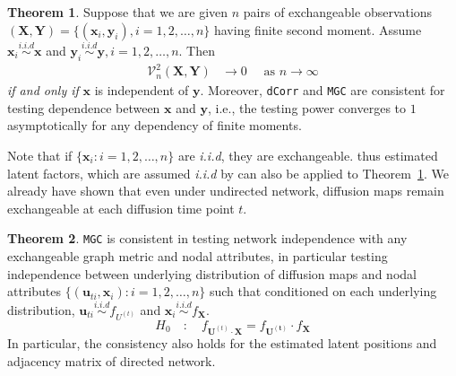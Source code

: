 \documentclass[12pt]{article}
\theoremstyle{definition}
\newtheorem{theorem}{Theorem}[section]
\begin{document}
\begin{theorem}
	Suppose that we are given $n$ pairs of exchangeable observations $(\mathbf{X}, \mathbf{Y}) = \{  (\mathbf{x}_{i}, \mathbf{y}_{i} ), i = 1,2, \ldots, n \}$ having finite second moment. Assume $\mathbf{x}_{i} \overset{i.i.d}{\sim} \mathbf{x}$ and $\mathbf{y}_{i} \overset{i.i.d}{\sim} \mathbf{y}, i = 1,2, \ldots, n$. Then
	\begin{eqnarray}
		\mathcal{V}_{n}^{2}(\mathbf{X},\mathbf{Y}) &\longrightarrow 0 \quad \mbox{ as } n \rightarrow \infty
	\end{eqnarray}	
	\textit{if and only if} $\mathbf{x}$ is independent of $\mathbf{y}$. Moreover, \texttt{dCorr} and \texttt{MGC} are consistent for testing dependence between $\mathbf{x}$ and $\mathbf{y}$, i.e., the testing power converges to $1$ asymptotically for any dependency of finite moments.
	\label{theoremMain}
\end{theorem}

Note that if $\{ \mathbf{x}_{i} : i = 1,2,\ldots, n \}$ are \textit{i.i.d}, they are exchangeable. thus estimated latent factors, which are assumed \textit{i.i.d} by \cite{fosdick2015testing} can also be applied to Theorem~\ref{theoremMain}. We already have shown that even under undirected network, diffusion maps remain exchangeable at each diffusion time point $t$. 

\begin{theorem}
	\label{theorem2}
	\texttt{MGC} is consistent in testing network independence with any exchangeable graph metric and nodal attributes, in particular testing independence between underlying distribution of diffusion maps and nodal attributes $\{ ( \mathbf{u}_{ti},  \mathbf{x}_{i}  ) : i =1,2, \ldots , n \}$ such that conditioned on each underlying distribution, $\mathbf{u}_{ti} \overset{i.i.d}{\sim} f_{U^(t)}$ and $\mathbf{x}_{i} \overset{i.i.d}{\sim} f_{\mathbf{X}}$.
	\begin{equation}
	H_{0}  \quad : \quad f_{\mathbf{U}^{(t)} \cdot \mathbf{X}  }  = f_{\mathbf{U^{(t)}}} \cdot f_{\mathbf{X}}
	\label{eq:hypothesis}
	\end{equation}
	 In particular, the consistency also holds for the estimated latent positions and adjacency matrix of directed network.
\end{theorem}
		
\end{document}
